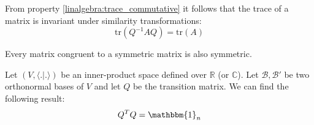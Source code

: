         \begin{property}
        	From property \ref{linalgebra:trace_commutative} it follows that the trace of a matrix is invariant under similarity transformations:
            \begin{equation}
            	\label{linalgebra:trace_invariance}
            	\boxed{\text{tr}(Q^{-1}AQ) = \text{tr}(A)}
            \end{equation}
        \end{property}
        
        \begin{property}
        	Every matrix congruent to a symmetric matrix is also symmetric.
        \end{property}
        
        \begin{theorem}
			\label{linalgebra:theorem:orthogonal_transition_matrix}
            Let $(V, \langle .|. \rangle)$ be an inner-product space defined over $\mathbb{R}$ (or $\mathbb{C}$). Let $\mathcal{B}, \mathcal{B}'$ be two orthonormal bases of $V$ and let $Q$ be the transition matrix. We can find the following result:\[Q^TQ = \mathbbm{1}_n\]
		\end{theorem}

